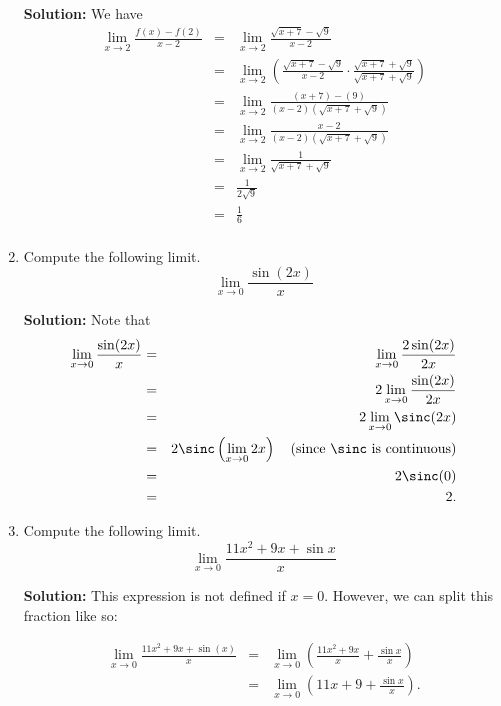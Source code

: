 \documentclass{article}
\begin{document}
\begin{enumerate}
\textbf{Solution:} We have
\begin{eqnarray*}
\lim_{x \rightarrow 2} \frac{f(x) - f(2)}{x - 2} & = & \lim_{x \rightarrow 2} \frac{\sqrt{x + 7} - \sqrt{9}}{x - 2} \\
 & = & \lim_{x \rightarrow 2} \left( \frac{\sqrt{x + 7} - \sqrt{9}}{x - 2} \cdot \frac{\sqrt{x + 7} + \sqrt{9}}{\sqrt{x + 7} + \sqrt{9}} \right) \\
 & = & \lim_{x \rightarrow 2} \frac{(x + 7) - (9)}{(x - 2)\left( \sqrt{x + 7} + \sqrt{9} \right)} \\
 & = & \lim_{x \rightarrow 2} \frac{x - 2}{(x - 2)\left( \sqrt{x + 7} + \sqrt{9} \right)} \\
 & = & \lim_{x \rightarrow 2} \frac{1}{\sqrt{x + 7} + \sqrt{9}} \\
 & = & \frac{1}{2\sqrt{9}} \\& = & \frac{1}{6} \\
\end{eqnarray*}


  
\vspace{1cm}

\item Compute the following limit. \[ \lim_{x \rightarrow 0} \frac{\sin(2 x)}{x} \]

\textbf{Solution:} Note that
\begin{eqnarray*}
\lim_{x \rightarrow 0} \frac{\sin(2 x)}{x}
 & = & \lim_{x \rightarrow 0} \frac{2\sin(2 x)}{2 x} \\
 & = & 2 \lim_{x \rightarrow 0} \frac{\sin(2 x)}{2 x} \\
 & = & 2 \lim_{x \rightarrow 0} \sinc(2 x) \\
 & = & 2 \sinc\left( \lim_{x \rightarrow 0} 2 x \right) \quad \mathrm{(since}\ \sinc\ \mathrm{is\ continuous)} \\
 & = & 2 \sinc(0) \\
 & = & 2.
\end{eqnarray*}


  
\vspace{1cm}

\item Compute the following limit. \[ \lim_{x \rightarrow 0} \frac{11 x^2 + 9 x + \sin x}{x} \]

\textbf{Solution:} This expression is not defined if $x = 0$. However, we can split this fraction like so:

\begin{eqnarray*}
\lim_{x \rightarrow 0} \frac{11 x^2 + 9 x + \sin(x)}{x}
 & = & \lim_{x \rightarrow 0} \left( \frac{11 x^2 + 9 x}{x} + \frac{\sin x}{x} \right) \\
 & = & \lim_{x \rightarrow 0} \left( 11 x + 9 + \frac{\sin x}{x} \right). \\
\end{eqnarray*}


\end{enumerate}
\end{document}
